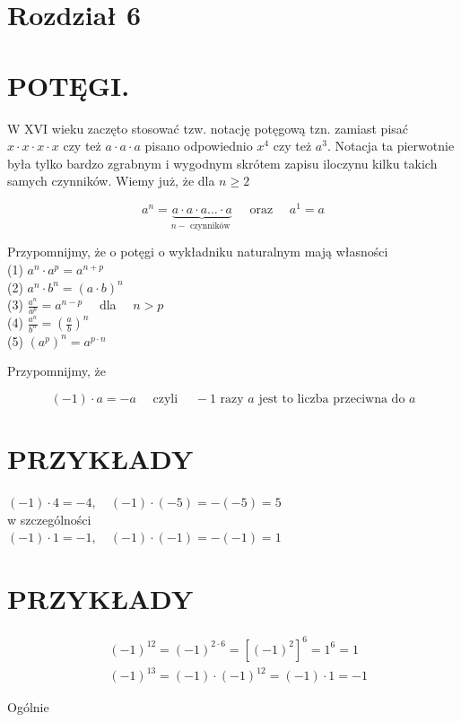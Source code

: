 \documentclass[10pt]{article}
\begin{document}
\section*{Rozdział 6}
\section*{POTĘGI.}
W XVI wieku zaczęto stosować tzw. notację potęgową tzn. zamiast pisać \(x \cdot x \cdot x \cdot x\) czy też \(a \cdot a \cdot a\) pisano odpowiednio \(x^{4}\) czy też \(a^{3}\). Notacja ta pierwotnie była tylko bardzo zgrabnym i wygodnym skrótem zapisu iloczynu kilku takich samych czynników. Wiemy już, że dla \(n \geqslant 2\)

\[
a^{n}=\underbrace{a \cdot a \cdot a \ldots \cdot a}_{n-\text { czynników }} \quad \text { oraz } \quad a^{1}=a
\]

Przypomnijmy, że o potęgi o wykładniku naturalnym mają własności\\
(1) \(a^{n} \cdot a^{p}=a^{n+p}\)\\
(2) \(a^{n} \cdot b^{n}=(a \cdot b)^{n}\)\\
(3) \(\frac{a^{n}}{a^{p}}=a^{n-p} \quad\) dla \(\quad n>p\)\\
(4) \(\frac{a^{n}}{b^{n}}=\left(\frac{a}{b}\right)^{n}\)\\
(5) \(\left(a^{p}\right)^{n}=a^{p \cdot n}\)

Przypomnijmy, że

\[
(-1) \cdot a=-a \quad \text { czyli } \quad-1 \text { razy } a \text { jest to liczba przeciwna do } a
\]

\section*{PRZYKŁADY}
\((-1) \cdot 4=-4, \quad(-1) \cdot(-5)=-(-5)=5\)\\
w szczególności\\
\((-1) \cdot 1=-1, \quad(-1) \cdot(-1)=-(-1)=1\)

\section*{PRZYKŁADY}
\[
\begin{aligned}
& (-1)^{12}=(-1)^{2 \cdot 6}=\left[(-1)^{2}\right]^{6}=1^{6}=1 \\
& (-1)^{13}=(-1) \cdot(-1)^{12}=(-1) \cdot 1=-1
\end{aligned}
\]

Ogólnie
\end{document}
